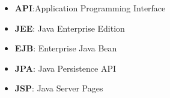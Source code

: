 \begin{itemize}
	\item \textbf{API}:\@ Application Programming Interface
	
\item \textbf{JEE}: Java Enterprise Edition

\item \textbf{EJB}: Enterprise Java Bean

\item \textbf{JPA}: Java Persistence API

\item \textbf{JSP}: Java Server Pages

\end{itemize}